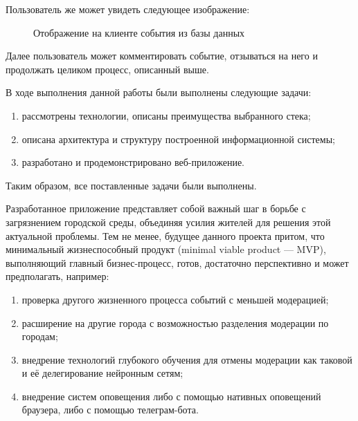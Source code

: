 \documentclass[diploma]{SCWorks}
\begin{document}
Пользователь же может увидеть следующее изображение:

\begin{figure}[H]
	\caption{Отображение на клиенте события из базы данных}
	\label{pic:view-frontend}
\end{figure}

Далее пользователь может комментировать событие, отзываться на него и 
продолжать целиком процесс, описанный выше.

\conclusion

В ходе выполнения данной работы были выполнены следующие задачи:
\begin{enumerate}
    \item рассмотрены технологии, описаны преимущества выбранного стека;
    \item описана архитектура и структуру построенной информационной системы;
    \item разработано и продемонстрировано веб-приложение.
\end{enumerate}

Таким образом, все поставленные задачи были выполнены.

Разработанное приложение представляет собой важный шаг в борьбе 
с загрязнением городской среды, объединяя усилия жителей для решения этой 
актуальной проблемы. Тем не менее, будущее данного проекта притом, что 
минимальный жизнеспособный продукт (minimal viable product — MVP), 
выполняющий главный бизнес-процесс, готов, достаточно перспективно и может 
предполагать, например:
\begin{enumerate}
    \item проверка другого жизненного процесса событий с меньшей модерацией;
    \item расширение на другие города с возможностью разделения модерации по 
    городам;
    \item внедрение технологий глубокого обучения для отмены модерации как 
    таковой и её делегирование нейронным сетям;
    \item внедрение систем оповещения либо с помощью нативных оповещений 
    браузера, либо с помощью телеграм-бота.
\end{enumerate}
\end{document}
